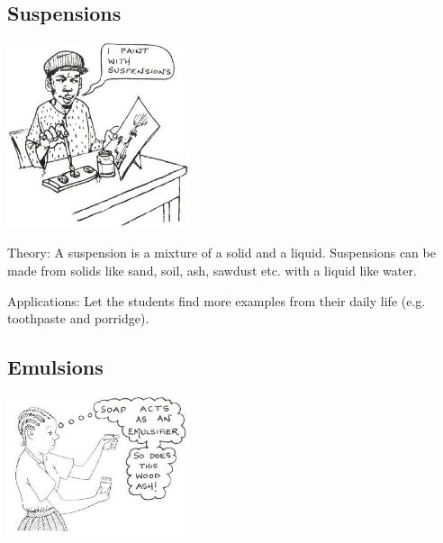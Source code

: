\begin{multicols}{2}
\subsection{Suspensions} 

\begin{center}
\includegraphics[width=0.4\textwidth]{./img/source/suspensions.jpg}
\end{center}

\begin{description*}
\item[Theory:]{A suspension is a mixture of a solid and a
liquid. Suspensions can be made from solids
like sand, soil, ash, sawdust etc. with a liquid
like water. }
\item[Applications:]{Let the students find more examples
from their daily life (e.g. toothpaste and
porridge).}
\end{description*}

\subsection{Emulsions}  %

\begin{center}
\includegraphics[width=0.4\textwidth]{./img/source/emulsions.jpg}
\end{center}


\end{multicols}
